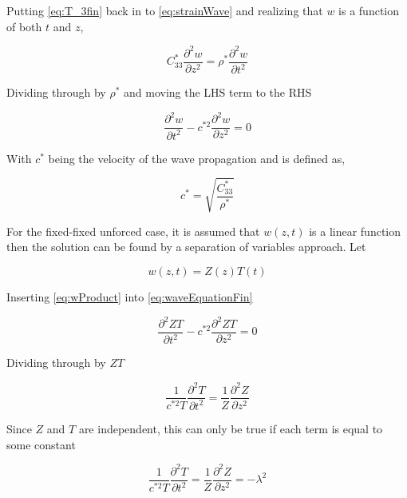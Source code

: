 Putting \ref{eq:T_3fin} back in to \ref{eq:strainWave} and realizing that $w$ is a function of both $t$ and $z$,

\begin{equation}
C^*_{33}\frac{\partial ^2w}{\partial z^2} = \rho^* \frac{\partial ^2w}{\partial t^2}
\end{equation}

Dividing through by $\rho^*$ and moving the LHS term to the RHS

\begin{equation}
\frac{\partial ^2w}{\partial t^2} - c^{*2} \frac{\partial ^2w}{\partial z^2} = 0
\label{eq:waveEquationFin}
\end{equation}


With $c^*$ being the velocity of the wave propagation and is defined as,

\begin{equation}
c^* = \sqrt{\frac{C^*_{33}}{\rho^*}}
\end{equation}

For the fixed-fixed unforced case, it is assumed that $w(z,t)$ is a linear function then the solution can be found by a separation of variables approach. Let 

\begin{equation}
w(z,t) = Z(z)T(t)
\label{eq:wProduct}
\end{equation}

Inserting \ref{eq:wProduct} into \ref{eq:waveEquationFin}

\begin{equation}
\frac{\partial ^2ZT}{\partial t^2} - c^{*2} \frac{\partial ^2ZT}{\partial z^2} = 0
\label{eq:waveEquationSub}
\end{equation}

Dividing through by $ZT$

\begin{equation}
\frac{1}{c^{*2}T}\frac{\partial ^2T}{\partial t^2} =  \frac{1}{Z}\frac{\partial ^2Z}{\partial z^2}
\label{eq:waveEquationDiv}
\end{equation}

Since $Z$ and $T$ are independent, this can only be true if each term is equal to some constant

\begin{equation}
\frac{1}{c^{*2}T}\frac{\partial ^2T}{\partial t^2} =  \frac{1}{Z}\frac{\partial ^2Z}{\partial z^2} = -\lambda ^2
\label{eq:waveEquationConst}
\end{equation}

